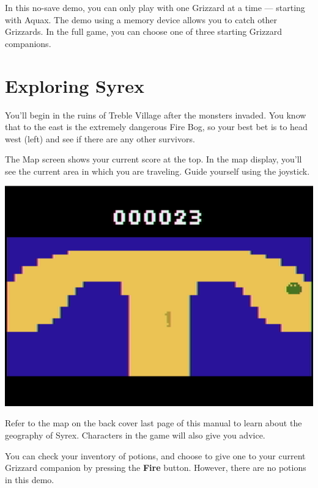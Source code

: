 \documentclass[10pt,twocolumn,openany,article]{memoir}
\begin{document}
\fi
\fi
\ifdefined\NOSAVE

In this no-save demo, you can only  play with one Grizzard at a time ---
starting with Aquax. The demo using  a memory device allows you to catch
other Grizzards. In the full game,  you can choose one of three starting
Grizzard companions.

\fi

\section{Exploring Syrex}

You'll begin in the ruins of  Treble Village after the monsters invaded.
You know that to  the east is the extremely dangerous  Fire Bog, so your
best  bet   is  to  head   west  (left)  and   see  if  there   are  any
other survivors.

The Map screen shows your current score  at the top. In the map display,
you'll see the  current area in which you are  traveling. Guide yourself
using the joystick.

\begin{center}
  \includegraphics[width=\columnwidth]{../Manual/MapNTSC.png}
\end{center}

Refer to  the map on  the \ifdefined\ATARIAGESAVE back cover  \else last
page  \fi{} of  this  manual  to learn  about  the  geography of  Syrex.
Characters in the game will also give you advice.

You can check your inventory of potions,  and choose to give one to your
current  Grizzard  companion  by   pressing  the  \textbf{Fire}  button.
\ifdefined\DEMO However, there are no potions in this demo. \fi
\end{document}
